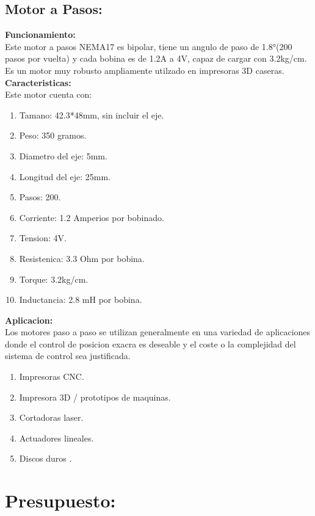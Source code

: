 \documentclass[14pt,a4paper]{article}
\begin{document}
\subsection{Motor a Pasos:}
\textbf{Funcionamiento:}\\
Este motor a pasos NEMA17 es bipolar, tiene un angulo de paso de 1.8°(200 pasos por vuelta) y cada bobina es de 1.2A a 4V, capaz de cargar con 3.2kg/cm. Es un motor muy robusto ampliamente utilzado en impresoras 3D caseras.
\textbf{Caracteristicas:}\\
Este motor cuenta con:\\
\begin{enumerate}
\item Tamano: 42.3*48mm, sin incluir el eje.
\item Peso: 350 gramos.
\item Diametro del eje: 5mm.
\item Longitud del eje: 25mm.
\item Pasos: 200.
\item Corriente: 1.2 Amperios por bobinado.
\item Tension: 4V.
\item Resistenica: 3.3 Ohm por bobina.
\item Torque: 3.2kg/cm.
\item Inductancia: 2.8 mH por bobina.
\end{enumerate}
\textbf{Aplicacion:}\\
Los motores paso a paso se utilizan generalmente en una variedad de aplicaciones donde el control de posicion exacra es deseable y el coste o la complejidad del sistema de control sea justificada.\\
\begin{enumerate}
\item Impresoras CNC.
\item Impresora 3D / prototipos de maquinas.
\item Cortadoras laser.
\item Actuadores lineales.
\item Discos duros .
\end{enumerate}

\section{Presupuesto:}
\end{document}
